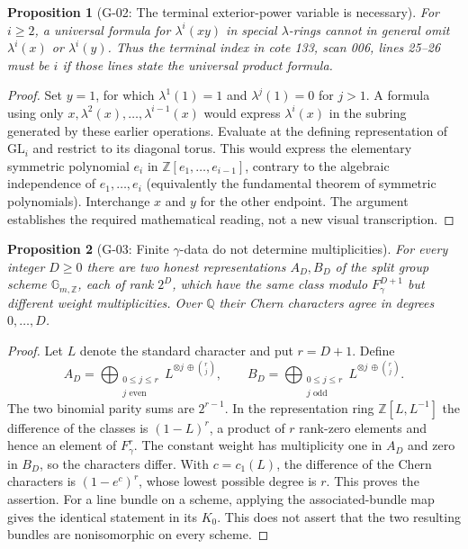 \documentclass[11pt,a4paper]{article}
\newtheorem{proposition}{Proposition}
\theoremstyle{definition}\newtheorem{definition}{Definition}
\begin{document}
\begin{proposition}[G-02: The terminal exterior-power variable is necessary]\label{G-02}
For $i\geq2$, a universal formula for $\lambda^i(xy)$ in special $\lambda$-rings cannot in general omit $\lambda^i(x)$ or $\lambda^i(y)$. Thus the terminal index in cote 133, scan 006, lines 25--26 must be $i$ if those lines state the universal product formula.
\end{proposition}
\begin{proof}
Set $y=1$, for which $\lambda^1(1)=1$ and $\lambda^j(1)=0$ for $j>1$. A formula using only $x,\lambda^2(x),\ldots,\lambda^{i-1}(x)$ would express $\lambda^i(x)$ in the subring generated by these earlier operations. Evaluate at the defining representation of $\mathrm{GL}_i$ and restrict to its diagonal torus. This would express the elementary symmetric polynomial $e_i$ in $\mathbb Z[e_1,\ldots,e_{i-1}]$, contrary to the algebraic independence of $e_1,\ldots,e_i$ (equivalently the fundamental theorem of symmetric polynomials). Interchange $x$ and $y$ for the other endpoint. The argument establishes the required mathematical reading, not a new visual transcription.
\end{proof}

\begin{proposition}[G-03: Finite $\gamma$-data do not determine multiplicities]\label{G-03}
For every integer $D\geq0$ there are two honest representations $A_D,B_D$ of the split group scheme $\mathbb G_{m,\mathbb Z}$, each of rank $2^D$, which have the same class modulo $F^{D+1}_\gamma$ but different weight multiplicities. Over $\mathbb Q$ their Chern characters agree in degrees $0,\ldots,D$.
\end{proposition}
\begin{proof}
Let $L$ denote the standard character and put $r=D+1$. Define
\[
 A_D=\bigoplus_{\substack{0\leq j\leq r\\j\text{ even}}}L^{\otimes j\,\oplus\binom rj},\qquad
 B_D=\bigoplus_{\substack{0\leq j\leq r\\j\text{ odd}}}L^{\otimes j\,\oplus\binom rj}.
\]
The two binomial parity sums are $2^{r-1}$. In the representation ring $\mathbb Z[L,L^{-1}]$ the difference of the classes is $(1-L)^r$, a product of $r$ rank-zero elements and hence an element of $F^r_\gamma$. The constant weight has multiplicity one in $A_D$ and zero in $B_D$, so the characters differ. With $c=c_1(L)$, the difference of the Chern characters is $(1-e^c)^r$, whose lowest possible degree is $r$. This proves the assertion. For a line bundle on a scheme, applying the associated-bundle map gives the identical statement in its $K_0$. This does not assert that the two resulting bundles are nonisomorphic on every scheme.
\end{proof}
\end{document}
